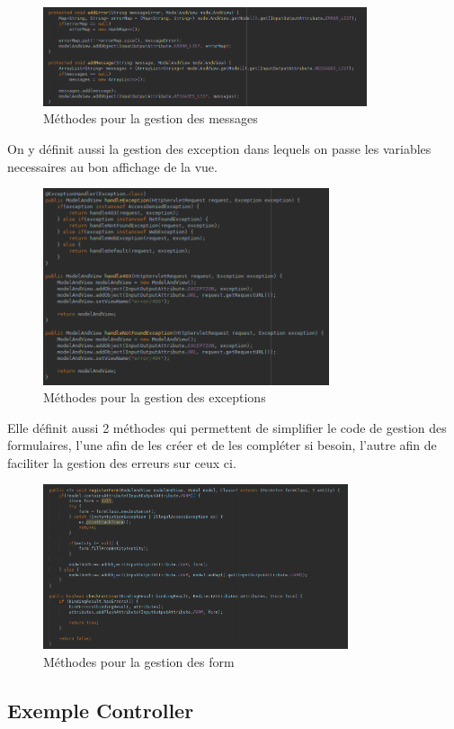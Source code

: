 			\begin{figure}[H]
				\centering\includegraphics[width=0.85\textwidth, keepaspectratio]{res/AbstractWebController-messages.png}
				\caption{Méthodes pour la gestion des messages}
			\end{figure}

			On y définit aussi la gestion des exception dans lequels on passe les variables necessaires au bon affichage de la vue.

			\begin{figure}[H]
				\centering\includegraphics[width=0.75\textwidth, keepaspectratio]{res/AbstractWebController-exception.png}
				\caption{Méthodes pour la gestion des exceptions}
			\end{figure}

			Elle définit aussi 2 méthodes qui permettent de simplifier le code de gestion des formulaires, l'une afin de les créer et de les compléter si besoin, l'autre afin de faciliter la gestion des erreurs sur ceux ci.

			\begin{figure}[H]
				\centering\includegraphics[width=0.80\textwidth, keepaspectratio]{res/AbstractWebController-form.png}
				\caption{Méthodes pour la gestion des form}
			\end{figure}

		\subsection{Exemple Controller}

